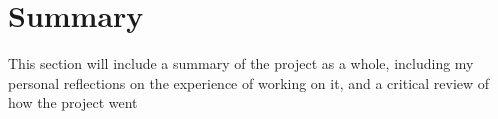 \section{Summary}
{\color{red}
This section will include a summary of the project as a whole, including my personal reflections on the experience of working on it, and a critical review of how the project went
}